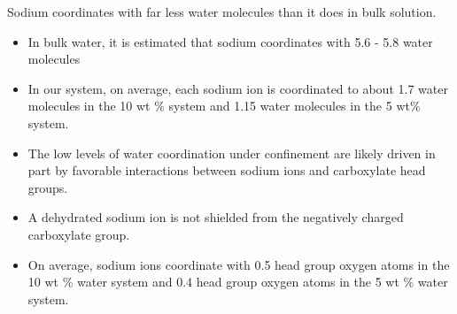 \documentclass{article}
\begin{document}
  \noindent Sodium coordinates with far less water molecules than it does in 
  bulk solution.
  \begin{itemize}
    \item In bulk water, it is estimated that sodium coordinates with 5.6 - 5.8 water
    molecules~\cite{rowley_solvation_2012}
    \item In our system, on average, each sodium ion is coordinated to about 1.7 
    water molecules in the 10 wt \% system and 1.15 water molecules in the 5 wt\% 
    system.
    \item The low levels of water coordination under confinement are likely driven
    in part by favorable interactions between sodium ions and carboxylate head groups.
    \item A dehydrated sodium ion is not shielded from the negatively charged 
    carboxylate group.~\cite{ma_drastically_2019}
    \item On average, sodium ions coordinate with 0.5 head group oxygen atoms in the
    10 wt \% water system and 0.4 head group oxygen atoms in the 5 wt \% water system. 
  \end{itemize}
  
\end{document}
